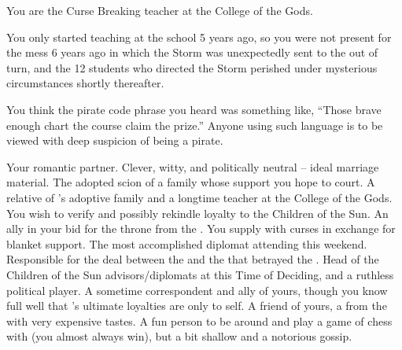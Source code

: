 \documentclass[char]{GL2020}
\begin{document}
\begin{itemz}[Notes]
	\item You are the Curse Breaking teacher at the College of the Gods.
	\item You only started teaching at the school 5 years ago, so you were not present for the mess 6 years ago in which the Storm was unexpectedly sent to the \pShip{} out of turn, and the 12 students who directed the Storm perished under mysterious circumstances shortly thereafter.
	\item You think the pirate code phrase you heard was something like, ``Those brave enough chart the course claim the prize.'' Anyone using such language is to be viewed with deep suspicion of being a pirate.
\end{itemz}

\begin{contacts}
	\contact{\cPirate{}} Your romantic partner. Clever, witty, and politically neutral -- ideal marriage material.
	\contact{\cAdopted{}} The adopted scion of a family whose support you hope to court.
	\contact{\cMusic{}} A relative of \cAdopted{}'s adoptive family and a longtime teacher at the College of the Gods. You wish to verify and possibly rekindle \cMusic{\their} loyalty to the Children of the Sun.
	\contact{\cAntiChup{}} An ally in your bid for the throne from the \pTech{}. You supply \cAntiChup{\them} with curses in exchange for blanket support.
	\contact{\cDiplomat{}} The most accomplished diplomat attending this weekend. Responsible for the deal between the \pFarm{} and the \pTech{} that betrayed the \pShip{}.
	\contact{\cEvil{}} Head of the Children of the Sun advisors/diplomats at this Time of Deciding, and a ruthless political player. A sometime correspondent and ally of yours, though you know full well that \cEvil{}'s ultimate loyalties are only to \cEvil{\them}self.
            \contact{\cHedonist{}} A friend of yours, a \cHedonist{\cleric} from the \pFarm{} with very expensive tastes. A fun person to be around and play a game of chess with (you almost always win), but a bit shallow and a notorious gossip.
\end{contacts}
\end{document}
